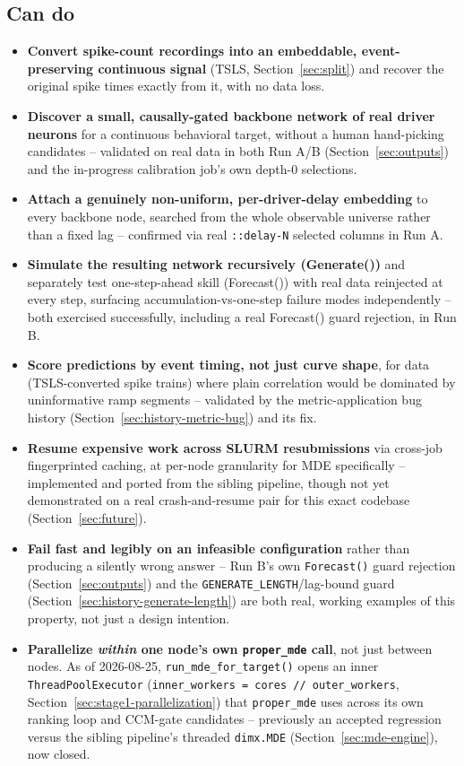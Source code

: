 \documentclass[11pt]{article}
\begin{document}
\subsection{Can do}
\begin{itemize}
  \item \textbf{Convert spike-count recordings into an embeddable, event-preserving continuous signal} (TSLS, Section~\ref{sec:split}) and recover the original spike times exactly from it, with no data loss.
  \item \textbf{Discover a small, causally-gated backbone network of real driver neurons} for a continuous behavioral target, without a human hand-picking candidates -- validated on real data in both Run A/B (Section~\ref{sec:outputs}) and the in-progress calibration job's own depth-0 selections.
  \item \textbf{Attach a genuinely non-uniform, per-driver-delay embedding} to every backbone node, searched from the whole observable universe rather than a fixed lag -- confirmed via real \texttt{::delay-N} selected columns in Run A.
  \item \textbf{Simulate the resulting network recursively (Generate())} and separately test one-step-ahead skill (Forecast()) with real data reinjected at every step, surfacing accumulation-vs-one-step failure modes independently -- both exercised successfully, including a real Forecast() guard rejection, in Run B.
  \item \textbf{Score predictions by event timing, not just curve shape}, for data (TSLS-converted spike trains) where plain correlation would be dominated by uninformative ramp segments -- validated by the metric-application bug history (Section~\ref{sec:history-metric-bug}) and its fix.
  \item \textbf{Resume expensive work across SLURM resubmissions} via cross-job fingerprinted caching, at per-node granularity for MDE specifically -- implemented and ported from the sibling pipeline, though not yet demonstrated on a real crash-and-resume pair for this exact codebase (Section~\ref{sec:future}).
  \item \textbf{Fail fast and legibly on an infeasible configuration} rather than producing a silently wrong answer -- Run B's own \texttt{Forecast()} guard rejection (Section~\ref{sec:outputs}) and the \texttt{GENERATE\_LENGTH}/lag-bound guard (Section~\ref{sec:history-generate-length}) are both real, working examples of this property, not just a design intention.
  \item \textbf{Parallelize \emph{within} one node's own \texttt{proper\_mde} call}, not just between nodes. As of 2026-08-25, \texttt{run\_mde\_for\_target()} opens an inner \texttt{ThreadPoolExecutor} (\texttt{inner\_workers = cores // outer\_workers}, Section~\ref{sec:stage1-parallelization}) that \texttt{proper\_mde} uses across its own ranking loop and CCM-gate candidates -- previously an accepted regression versus the sibling pipeline's threaded \texttt{dimx.MDE} (Section~\ref{sec:mde-engine}), now closed.

\end{itemize}
\end{document}
